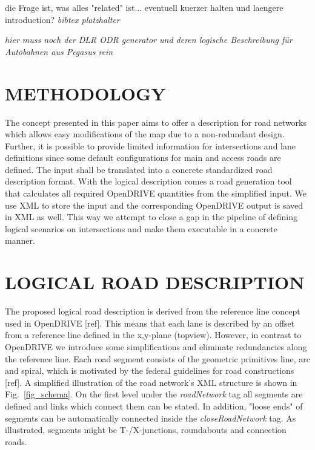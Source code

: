 \documentclass[a4paper, 10pt, conference]{ieeeconf}      %
\begin{document}
die Frage ist, was alles "related" ist... eventuell kuerzer halten und laengere introduction? \textit{bibtex platzhalter} \cite{BagschikG..2018} \cite{Roesener2017}

\textit{hier muss noch der DLR ODR generator und deren logische Beschreibung für Autobahnen aus Pegasus rein \cite{dlrODRgen}}

\section{METHODOLOGY}
The concept presented in this paper aims to offer a description for road networks which allows easy modifications of the map due to a non-redundant design. Further, it is possible to provide limited information for intersections and lane definitions since some default configurations for main and access roads are defined. The input shall be translated into a concrete standardized road description format. With the logical description comes a road generation tool that calculates all required OpenDRIVE quantities from the simplified input. We use XML to store the input and the corresponding OpenDRIVE output is saved in XML as well. This way we attempt to close a gap in the pipeline of defining logical scenarios on intersections and make them executable in a concrete manner.

\section{LOGICAL ROAD DESCRIPTION}
The proposed logical road description is derived from the reference line concept used in OpenDRIVE [ref]. This means that each lane is described by an offset from a reference line defined in the x,y-plane (topview). However, in contrast to OpenDRIVE we introduce some simplifications and eliminate redundancies along the reference line. Each road segment consists of the geometric primitives line, arc and spiral, which is motivated by the federal guidelines for road constructions [ref]. A simplified illustration of the road network's XML structure is shown in Fig.~\ref{fig_schema}. On the first level under the \textit{roadNetwork} tag all segments are defined and links which connect them can be stated. In addition, "loose ends" of segments can be automatically connected inside the \textit{closeRoadNetwork} tag. As illustrated, segments might be T-/X-junctions, roundabouts and connection roads. 
\end{document}
